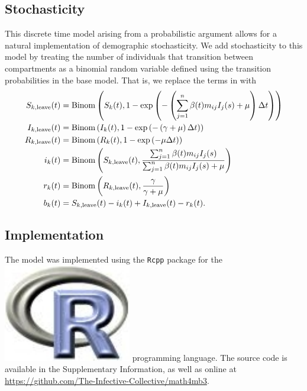 \documentclass[12pt]{article}
\newcommand{\Rlogo}{\protect\includegraphics[height=2ex,keepaspectratio]{Rlogo.pdf}\xspace}
\begin{document}

\subsection{Stochasticity} \label{ss:stoch_model}
This discrete time model arising from a probabilistic argument allows for a natural implementation of demographic stochasticity. We add stochasticity to this model by treating the number of individuals that transition between compartments as a binomial random variable defined using the transition probabilities in the base model. That is, we replace the terms in  with
\begin{equation}
\label{eq:stochastic}
\begin{aligned}
S_{k, \tiny{\textrm{leave}}}(t) &= \mathrm{Binom}\left(S_k(t), 1 - \exp \left(-\left(\sum_{j=1}^n \beta(t) m_{ij} I_j(s) + \mu \right) \Delta t \right)\right)\\
I_{k, \tiny{\textrm{leave}}}(t) &= \mathrm{Binom}\left(I_k(t), 1 - \exp \left(-\left(\gamma + \mu \right) \Delta t \right)\right)\\
R_{k, \tiny{\textrm{leave}}}(t) &= \mathrm{Binom}\left(R_k(t), 1 - \exp \left(-\mu \Delta t \right)\right)\\
i_k(t) &= \mathrm{Binom}\left(S_{k, \tiny{\textrm{leave}}}(t), \frac{\sum_{j=1}^n \beta(t) m_{ij} I_j(s)}{\sum_{j=1}^n \beta(t) m_{ij} I_j(s) + \mu}\right)\\
r_k(t) &= \mathrm{Binom}\left(R_{k, \tiny{\textrm{leave}}}(t), \frac{\gamma}{\gamma + \mu}\right) \\
b_k(t) &= S_{k, \tiny{\textrm{leave}}}(t) - i_k(t) + I_{k, \tiny{\textrm{leave}}}(t) - r_k(t).
\end{aligned}
\end{equation}

\subsection{Implementation}
The model was implemented using the \texttt{Rcpp} package for the \Rlogo programming language. The source code is available in the Supplementary Information, as well as online at \url{https://github.com/The-Infective-Collective/math4mb3}.  
\end{document}
